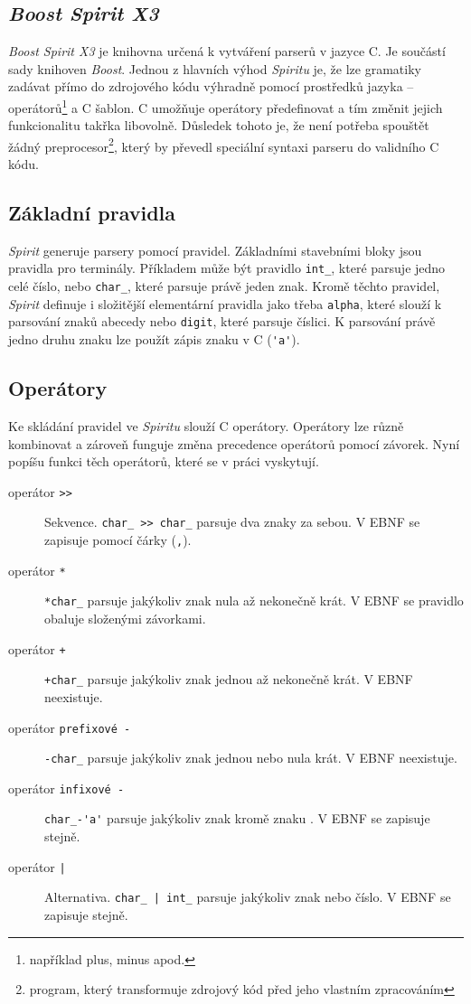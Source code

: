 \documentclass[thesis=B,czech,hidelinks]{FITthesis}[2019/03/06]
\newcommand{\Rplus}{\protect\hspace{-.1em}\protect\raisebox{.35ex}{\smaller{\smaller\textbf{+}}}}
\newcommand{\Cpp}{\mbox{C\Rplus\Rplus}\xspace}
\begin{document}
\subsection{\textit{Boost Spirit X3}}
\textit{Boost Spirit X3} je knihovna určená k vytváření parserů v jazyce \Cpp{}. Je součástí sady knihoven \textit{Boost}. Jednou z hlavních výhod \textit{Spiritu} je, že lze gramatiky zadávat přímo do zdrojového kódu výhradně pomocí prostředků jazyka -- operátorů\footnote{například plus, minus apod.} a \Cpp{} šablon. \Cpp{} umožňuje operátory předefinovat a tím změnit jejich funkcionalitu takřka libovolně. Důsledek tohoto je, že není potřeba spouštět žádný preprocesor\footnote{program, který transformuje zdrojový kód před jeho vlastním zpracováním}, který by převedl speciální syntaxi parseru do validního \Cpp{} kódu.

\subsection{Základní pravidla}
\textit{Spirit} generuje parsery pomocí pravidel. Základními stavebními bloky jsou pravidla pro terminály. Příkladem může být pravidlo \verb¨int_¨, které parsuje jedno celé číslo, nebo \verb¨char_¨, které parsuje právě jeden znak. Kromě těchto pravidel, \textit{Spirit} definuje i složitější elementární pravidla jako třeba \texttt{alpha}, které slouží k parsování znaků abecedy nebo \texttt{digit}, které parsuje číslici. K parsování právě jedno druhu znaku lze použít zápis znaku v \Cpp{} (\verb¨'a'¨).

\subsection{Operátory}
Ke skládání pravidel ve \textit{Spiritu} slouží \Cpp{} operátory. Operátory lze různě kombinovat a zároveň funguje změna precedence operátorů pomocí závorek. Nyní popíšu funkci těch operátorů, které se v práci vyskytují.
\begin{description}
    \item[operátor \texttt{>>}]{Sekvence. \verb¨char_ >> char_¨ parsuje dva znaky za sebou. V EBNF se zapisuje pomocí čárky (\texttt{,}).}
    \item[operátor \texttt{*}]{\verb¨*char_¨ parsuje jakýkoliv znak nula až nekonečně krát. V EBNF se pravidlo obaluje složenými závorkami.}
    \item[operátor \texttt{+}]{\verb¨+char_¨ parsuje jakýkoliv znak jednou až nekonečně krát. V EBNF neexistuje.}
    \item[operátor \texttt{prefixové -}]{\verb¨-char_¨ parsuje jakýkoliv znak jednou nebo nula krát. V EBNF neexistuje.}
    \item[operátor \texttt{infixové -}]{\verb¨char_-'a'¨ parsuje jakýkoliv znak kromě znaku . V EBNF se zapisuje stejně.}
    \item[operátor \texttt{|}]{Alternativa. \verb¨char_ | int_¨ parsuje jakýkoliv znak nebo číslo. V EBNF se zapisuje stejně.}
\end{description}
\end{document}
